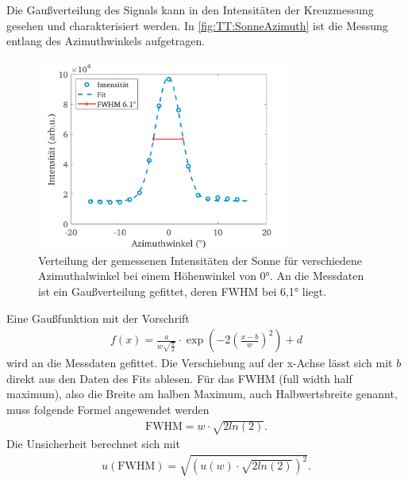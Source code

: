 \documentclass[../../main.tex]{subfiles}
\begin{document}
    Die Gaußverteilung des Signals kann in den Intensitäten der Kreuzmessung gesehen und charakterisiert werden. In \autoref{fig:TT:SonneAzimuth} ist die Messung entlang des Azimuthwinkels aufgetragen. 
    \begin{figure}[H]
        \centering
        \includegraphics[width=0.75\textwidth]{Bilddateien/Sun/Kreuz_Az_FitFig_2000.png}
        \caption{Verteilung der gemessenen Intensitäten der Sonne für verschiedene Azimuthalwinkel bei einem Höhenwinkel von \ang{0}. An die Messdaten ist ein Gaußverteilung gefittet, deren FWHM bei \ang{6,1} liegt.}
        \label{fig:TT:SonneAzimuth}
    \end{figure}
    Eine Gaußfunktion mit der Vorschrift
    \begin{align*}
        f(x) = \frac{a}{w\sqrt{\frac{\pi}{2}}} \cdot \exp\left(-2\left(\frac{x-b}{w} \right)^2\right)+d
    \end{align*}
    wird an die Messdaten gefittet. Die Verschiebung auf der x-Achse lässt sich mit $b$ direkt aus den Daten des Fits ablesen. Für das FWHM (full width half maximum), also die Breite am halben Maximum, auch Halbwertsbreite genannt, muss folgende Formel angewendet werden
    \begin{align}
        \text{FWHM} = w \cdot \sqrt{2ln(2)}.
    \end{align}
    Die Unsicherheit berechnet sich mit
    \begin{align*}
        u(\text{FWHM}) = \sqrt{\left( u(w) \cdot \sqrt{2ln(2)} \right)^{2}}.
    \end{align*}
\end{document}
